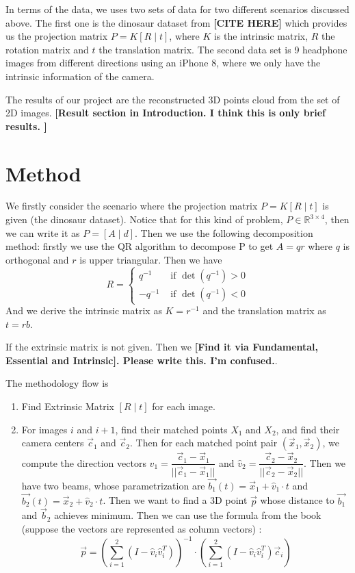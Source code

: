 \documentclass[10pt]{article}
\begin{document}
In terms of the data, we uses two sets of data for two different scenarios discussed above. The first one is the dinosaur dataset from \textbf{[CITE HERE]} which provides us the projection matrix $P = K [R\mid t]$, where $K$ is the intrinsic matrix, $R$ the rotation matrix and $t$ the translation matrix. The second data set is 9 headphone images from different directions using an iPhone 8, where we only have the intrinsic information of the camera. 

The results of our project are the reconstructed 3D points cloud from the set of 2D images. \textbf{[Result section in Introduction. I think this is only brief results. ]}


\section*{Method}
We firstly consider the scenario where the projection matrix $P= K [R\mid t]$ is given (the dinosaur dataset). 
Notice that for this kind of problem, $P \in \mathbb{R}^{3 \times 4}$, then we can write it as $P = [A \mid d]$.
Then we use the following decomposition method: firstly we use the QR algorithm to decompose P to get $A = qr$ where $q$ is orthogonal and $r$ is upper triangular. Then we have $$R = \begin{cases}
	q^{-1} & \text{ if } \det(q^{-1})  > 0 \\
	-q^{-1} & \text{ if } \det(q^{-1})  < 0 
\end{cases}$$
And we derive the intrinsic matrix as $K = r^{-1}$ and the translation matrix as $t = rb$. 

If the extrinsic matrix is not given. Then we \textbf{[Find it via Fundamental, Essential and Intrinsic]. Please write this. I'm confused.}.  

The methodology flow is \begin{enumerate}
	\item Find Extrinsic Matrix $[R \mid t]$ for each image.
	\item For images $i$ and $i+1$, find their matched points $X_1$ and $X_2$, and find their camera centers $\vec{c}_1$ and $\vec{c}_2$. Then for each matched point pair $(\vec{x}_1, \vec{x}_2)$, we compute the direction vectors $\hat{v}_1 = \dfrac{\vec{c}_1 - \vec{x}_1}{||\vec{c}_1 - \vec{x}_1||}$ and $\hat{v}_2 = \dfrac{\vec{c}_2 - \vec{x}_2}{||\vec{c}_2 - \vec{x}_2||}$. Then we have two beams, whose parametrization are $\vec{b_1}(t) = \vec{x}_1 + \hat{v}_1 \cdot t$  and $\vec{b_2} (t) = \vec{x}_2 + \hat{v}_2 \cdot t$. Then we want to find a 3D point $\vec{p}$ whose distance to $\vec{b_1}$ and $\vec{b}_2$ achieves minimum. Then we can use the formula from the book (suppose the vectors are represented as column vectors) : $$\displaystyle \vec{p} = \left(\sum_{i=1}^2 (I - \hat{v}_i \hat{v}_i^T ) \right)^{-1} \cdot \left(\sum_{i=1}^2 (I - \hat{v}_i \hat{v}_i^T ) \vec{c}_i \right)$$
\end{enumerate}
\end{document}
